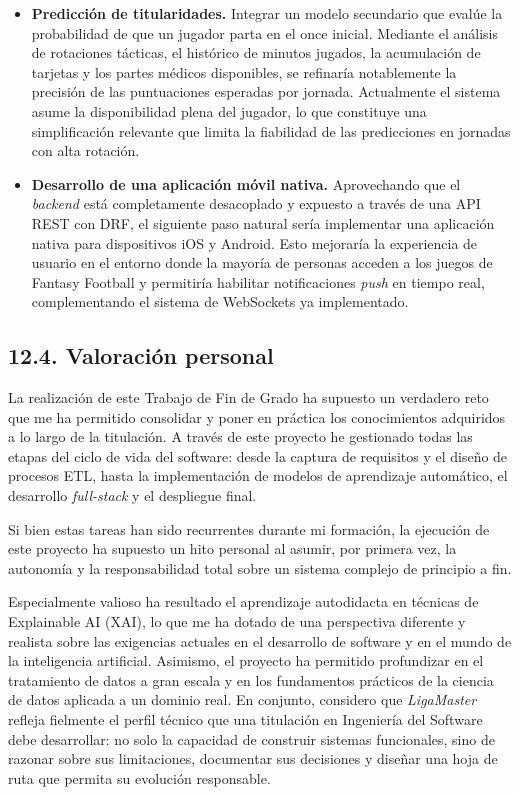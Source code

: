 \begin{itemize}
  \item \textbf{Predicción de titularidades.} Integrar un modelo
        secundario que evalúe la probabilidad de que un jugador parta
        en el once inicial. Mediante el análisis de rotaciones tácticas,
        el histórico de minutos jugados, la acumulación de tarjetas y
        los partes médicos disponibles, se refinaría notablemente la
        precisión de las puntuaciones esperadas por jornada. Actualmente
        el sistema asume la disponibilidad plena del jugador, lo que
        constituye una simplificación relevante que limita la fiabilidad
        de las predicciones en jornadas con alta rotación.

  \item \textbf{Desarrollo de una aplicación móvil nativa.}
        Aprovechando que el \textit{backend} está completamente
        desacoplado y expuesto a través de una API REST con DRF, el
        siguiente paso natural sería implementar una aplicación nativa
        para dispositivos iOS y Android. Esto mejoraría la experiencia
        de usuario en el entorno donde la mayoría de personas acceden
        a los juegos de Fantasy Football y permitiría habilitar
        notificaciones \textit{push} en tiempo real, complementando el
        sistema de WebSockets ya implementado.

\end{itemize}

\subsection{12.4. Valoración personal}
\label{subsec:valoracion_personal}

La realización de este Trabajo de Fin de Grado ha supuesto un verdadero
reto que me ha permitido consolidar y poner en práctica los conocimientos
adquiridos a lo largo de la titulación. A través de este proyecto he
gestionado todas las etapas del ciclo de vida del software: desde la
captura de requisitos y el diseño de procesos ETL, hasta la
implementación de modelos de aprendizaje automático, el desarrollo
\textit{full-stack} y el despliegue final.

Si bien estas tareas han sido recurrentes durante mi formación, la
ejecución de este proyecto ha supuesto un hito personal al asumir, por
primera vez, la autonomía y la responsabilidad total sobre un sistema
complejo de principio a fin.

Especialmente valioso ha resultado el aprendizaje autodidacta en técnicas
de Explainable AI (XAI), lo que me ha dotado de una perspectiva diferente
y realista sobre las exigencias actuales en el desarrollo de software y
en el mundo de la inteligencia artificial. Asimismo, el proyecto ha
permitido profundizar en el tratamiento de datos a gran escala y en los
fundamentos prácticos de la ciencia de datos aplicada a un dominio real.
En conjunto, considero que \textit{LigaMaster} refleja fielmente el
perfil técnico que una titulación en Ingeniería del Software debe
desarrollar: no solo la capacidad de construir sistemas funcionales, sino
de razonar sobre sus limitaciones, documentar sus decisiones y diseñar
una hoja de ruta que permita su evolución responsable.